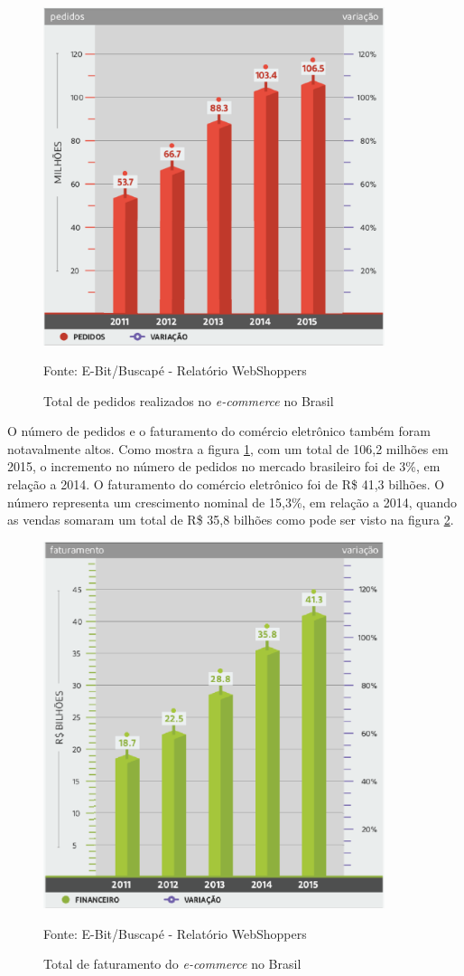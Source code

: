 \documentclass[a4paper,12pt]{monografia}
\begin{document}
\begin{figure}[H]
\centering
\includegraphics[width=10cm]{img/webshoppers/total-pedidos.eps}
\caption{Total de pedidos realizados no \textit{e-commerce} no Brasil}
\small{Fonte: E-Bit/Buscapé - Relatório WebShoppers}
\label{figura:pedidos}
\end{figure}

O número de pedidos e o faturamento do comércio eletrônico também foram notavalmente altos. Como mostra a figura \ref{figura:pedidos}, com um total de 106,2 milhões em 2015, o incremento no número de pedidos no mercado brasileiro foi de 3\%, em relação a 2014. O faturamento do comércio eletrônico foi de R\$ 41,3 bilhões. O número representa um crescimento nominal de 15,3\%, em relação a 2014, quando as vendas somaram um total de R\$ 35,8 bilhões como pode ser visto na figura \ref{figura:vendas}.

\begin{figure}[H]
\centering
\includegraphics[width=10cm]{img/webshoppers/faturamento.eps}
\caption{Total de faturamento do \textit{e-commerce} no Brasil}
\small{Fonte: E-Bit/Buscapé - Relatório WebShoppers}
\label{figura:vendas}
\end{figure}
\end{document}
